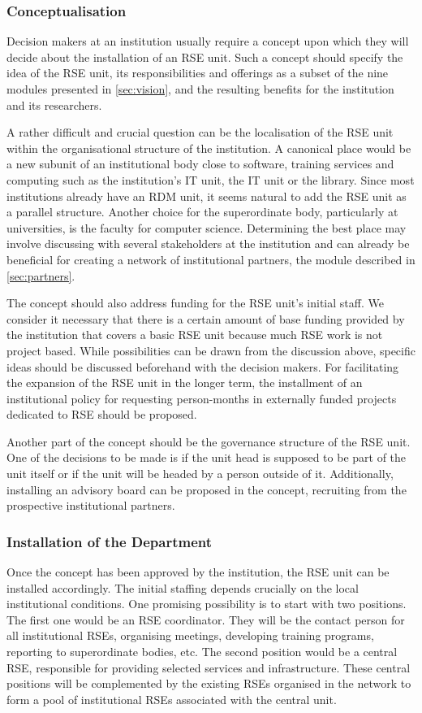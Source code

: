 \documentclass[a4paper]{article}
\begin{document}
\subsubsection{Conceptualisation}
Decision makers at an institution usually require a concept upon which they will decide about the installation of an RSE unit.
Such a concept should specify the idea of the RSE unit, its responsibilities and offerings as a subset of the nine modules presented in \autoref{sec:vision}, and the resulting benefits for the institution and its researchers.

A rather difficult and crucial question can be the localisation of the RSE unit within the organisational structure of the institution.
A canonical place would be a new subunit of an institutional body close to software,
training services and computing such as the institution's IT unit, the IT unit or the library.
Since most institutions already have an RDM unit, it seems natural to add the RSE unit as a parallel structure.
Another choice for the superordinate body, particularly at universities, is the faculty for computer science.
Determining the best place may involve discussing with several stakeholders at the institution and can already be beneficial for creating a
network of institutional partners, the module described in \autoref{sec:partners}.

The concept should also address funding for the RSE unit's initial staff.
We consider it necessary that there is a certain amount of base funding provided by the institution that covers a basic RSE unit because much RSE work is not project based.
While possibilities can be drawn from the discussion above, specific ideas should be discussed beforehand with the decision makers.
For facilitating the expansion of the RSE unit in the longer term, the installment of an institutional policy for requesting person-months in externally funded projects dedicated to RSE should be proposed.

Another part of the concept should be the governance structure of the RSE unit.
One of the decisions to be made is if the unit head is supposed to be part of the unit itself or if the unit will be headed by a person outside of it.
Additionally, installing an advisory board can be proposed in the concept, recruiting from the prospective institutional partners.

\subsubsection{Installation of the Department}
Once the concept has been approved by the institution, the RSE unit can be installed accordingly.
The initial staffing depends crucially on the local institutional conditions.
One promising possibility is to start with two positions.
The first one would be an RSE coordinator.
They will be the contact person for all institutional RSEs, organising meetings, developing training programs, reporting to superordinate bodies, etc.
The second position would be a central RSE, responsible for providing selected services and infrastructure.
These central positions will be complemented by the existing RSEs organised in the network to form a pool of institutional RSEs associated with the central unit.
\end{document}
